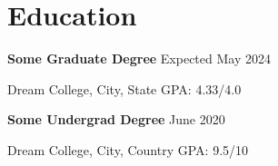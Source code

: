 \renewcommand{\subsection}[3]{
    \noindent\textbf{#1}  \emph{#2} \hfill #3 \break
}

\section{Education}
\subsection{Some Graduate Degree}{}{Expected May 2024}
Dream College, City, State \hfill GPA: 4.33/4.0

\subsection{Some Undergrad Degree}{}{June 2020}
Dream College, City, Country \hfill GPA: 9.5/10

\vspace{0.2em}